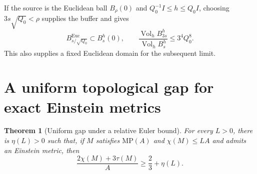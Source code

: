 \documentclass[a4paper,11pt]{article}
\theoremstyle{paper}
\newtheorem{theorem}{Theorem}[section]
\DeclareMathOperator{\Vol}{Vol}
\numberwithin{equation}{section}
\begin{document}
If the source is the Euclidean ball $B_\rho(0)$ and $Q_0^{-1}I\le h\le Q_0I$, choosing $3s\sqrt{Q_0}<\rho$ supplies the buffer and gives
\[
B^{\mathrm{Euc}}_{s/\sqrt{Q_0}}\subset B_s^h(0),\qquad
\frac{\Vol_hB_{3s}^h}{\Vol_hB_s^h}\le3^4Q_0^8.
\]
This also supplies a fixed Euclidean domain for the subsequent limit.

\section{A uniform topological gap for exact Einstein metrics}

\begin{theorem}[Uniform gap under a relative Euler bound]\label{thm:exact}
For every $L>0$, there is $\eta(L)>0$ such that, if $M$ satisfies $\mathrm{MP}(A)$ and $\chi(M)\le LA$ and admits an Einstein metric, then
\begin{equation}\label{eq:exact-gap}
\frac{2\chi(M)+3\tau(M)}A\ge\frac23+\eta(L).
\end{equation}
\end{theorem}
\end{document}
